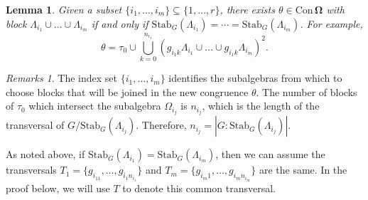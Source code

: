\documentclass[cm,dissertation]{uhthesis}
\theoremstyle{plain}
\newtheorem{lemma}[theorem]{Lemma}
\theoremstyle{definition}
\theoremstyle{remark}
\newtheorem*{remarks}{Remarks}
\numberwithin{theorem}{section}
\numberwithin{claim}{chapter}
\numberwithin{equation}{section}
\numberwithin{conjecture}{chapter}
\newcommand{\<}{\ensuremath{\langle}}
\renewcommand{\>}{\ensuremath{\rangle}}
\newcommand{\Stab}{\ensuremath{\mathrm{Stab}}}
\newcommand{\Con}{\ensuremath{\mathrm{Con\,}}}
\newcommand{\0}{\ensuremath{\mathbf{0}}}
\newcommand{\1}{\ensuremath{\mathbf{1}}}
\newcommand{\2}{\ensuremath{\mathbf{2}}}
\newcommand{\3}{\ensuremath{\mathbf{3}}}
\newcommand{\4}{\ensuremath{\mathbf{4}}}
\newcommand{\5}{\ensuremath{\mathbf{5}}}
\newcommand{\bOmega}{\ensuremath{\alg \Omega}}
\newcommand{\ConO}{\ensuremath{\Con \bOmega}}
\newcommand{\alg}[1]{\mathbf{#1}}
\begin{document}
\begin{lemma}
\label{lemma-intransGsets}
Given a subset $\{i_1, \dots, i_m\} \subseteq \{1,\dots, r\}$, 
there exists $\theta \in \ConO$ with block $\Lambda_{i_1} \cup \dots \cup \Lambda_{i_m}$ if and only if
$\Stab_G(\Lambda_{i_1}) = \cdots = \Stab_G(\Lambda_{i_m})$.  For example,
\begin{equation}
  \label{eq:th}
\theta = \tau_0 \cup \bigcup_{k=0}^{n_{i_1}} 
\left(g_{{i_1}k}\Lambda_{i_1} \cup \dots \cup g_{{i_1}k} \Lambda_{i_m}\right)^2. 
\end{equation}
\end{lemma}
\begin{remarks}
  The index set $\{i_1, \dots, i_m\}$ identifies the subalgebras from which to
  choose blocks that will be joined in the new congruence $\theta$.  
  The number of blocks of $\tau_0$ which
  intersect the subalgebra $\Omega_{i_j}$ is $n_{i_j}$, which is the length of the
  transversal of $G/\Stab_G(\Lambda_{i_j})$. Therefore, $n_{i_j} = |G:\Stab_G(\Lambda_{i_j})|$.  

  As noted above, if
  $\Stab_G(\Lambda_{i_1}) = \Stab_G(\Lambda_{i_m})$, then we can assume the transversals
  $T_1 = \{g_{i_11}, \dots, g_{i_1n_{i_1}}\}$ and  
  $T_m = \{g_{i_m1}, \dots,g_{i_mn_{i_m}}\}$ are the same. 
In the proof below, we will use $T$ to denote this common transversal.
\end{remarks}
\end{document}
